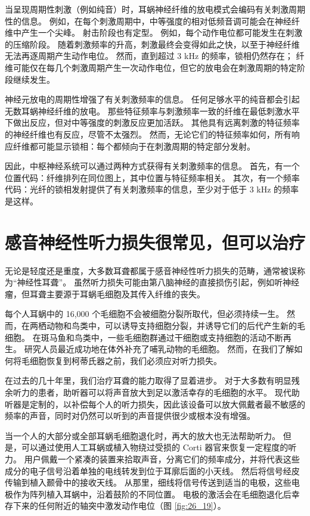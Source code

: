 当呈现周期性刺激（例如纯音）时，耳蜗神经纤维的放电模式会编码有关刺激周期性的信息。 例如，在每个刺激周期中，中等强度的相对低频音调可能会在神经纤维中产生一个尖峰。 射击阶段也有定型。 例如，每个动作电位都可能发生在刺激的压缩阶段。 随着刺激频率的升高，刺激最终会变得如此之快，以至于神经纤维无法再逐周期产生动作电位。 然而，直到超过 3 kHz 的频率，锁相仍然存在； 纤维可能仅在每几个刺激周期产生一次动作电位，但它的放电会在刺激周期的特定阶段继续发生。

神经元放电的周期性增强了有关刺激频率的信息。 任何足够水平的纯音都会引起无数耳蜗神经纤维的放电。 那些特征频率与刺激频率一致的纤维在最低刺激水平下做出反应，但对中等强度的刺激反应更加活跃。 其他具有远离刺激的特征频率的神经纤维也有反应，尽管不太强烈。 然而，无论它们的特征频率如何，所有响应纤维都可能显示锁相：每个都倾向于在刺激周期的特定部分发射。

因此，中枢神经系统可以通过两种方式获得有关刺激频率的信息。 首先，有一个位置代码：纤维排列在同位图上，其中位置与特征频率相关。 其次，有一个频率代码：光纤的锁相发射提供了有关刺激频率的信息，至少对于低于 3 kHz 的频率是这样。



\section{感音神经性听力损失很常见，但可以治疗}
无论是轻度还是重度，大多数耳聋都属于感音神经性听力损失的范畴，通常被误称为“神经性耳聋”。 虽然听力损失可能由第八脑神经的直接损伤引起，例如听神经瘤，但耳聋主要源于耳蜗毛细胞及其传入纤维的丧失。

每个人耳蜗中的 16,000 个毛细胞不会被细胞分裂所取代，但必须持续一生。 然而，在两栖动物和鸟类中，可以诱导支持细胞分裂，并诱导它们的后代产生新的毛细胞。 在斑马鱼和鸟类中，一些毛细胞群通过干细胞或支持细胞的活动不断再生。 研究人员最近成功地在体外补充了哺乳动物的毛细胞。 然而，在我们了解如何将毛细胞恢复到柯蒂氏器之前，我们必须应对听力损失。

在过去的几十年里，我们治疗耳聋的能力取得了显着进步。 对于大多数有明显残余听力的患者，助听器可以将声音放大到足以激活幸存的毛细胞的水平。 现代助听器是定制的，以补偿每个人的听力损失，因此该设备可以放大佩戴者最不敏感的频率的声音，同时对仍然可以听到的声音提供很少或根本没有增强。

当一个人的大部分或全部耳蜗毛细胞退化时，再大的放大也无法帮助听力。 但是，可以通过使用人工耳蜗或植入物绕过受损的 Corti 器官来恢复一定程度的听力。 用户佩戴一个紧凑的装置来拾取声音，分离它们的频率成分，并将代表这些成分的电子信号沿着单独的电线转发到位于耳廓后面的小天线。 然后将信号经皮传输到植入颞骨中的接收天线。 从那里，细线将信号传送到适当的电极，这些电极作为阵列植入耳蜗中，沿着鼓阶的不同位置。 
电极的激活会在毛细胞退化后幸存下来的任何附近的轴突中激发动作电位（图 \ref{fig:26_19}）。

